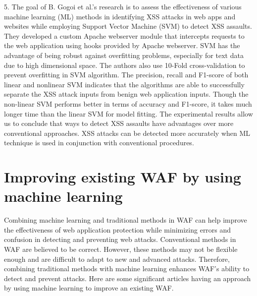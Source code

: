 5.	The goal of B. Gogoi et al.\cite{Gogoi}'s research is to assess the effectiveness of various machine learning (ML) methods in identifying XSS attacks in web apps and websites while employing Support Vector Machine (SVM) to detect XSS assaults. They developed a custom Apache webserver module that intercepts requests to the web application using hooks provided by Apache webserver. SVM has the advantage of being robust against overfitting problems, especially for text data due to high dimensional space. The authors also use 10-Fold cross-validation to prevent overfitting in SVM algorithm. The precision, recall and F1-score of both linear and nonlinear SVM indicates that the algorithms are able to successfully separate the XSS attack inputs from benign web application inputs.  Though the non-linear SVM performs better in terms of accuracy and F1-score, it takes much longer time than the linear SVM for model fitting. The experimental results allow us to conclude that ways to detect XSS assaults have advantages over more conventional approaches. XSS attacks can be detected more accurately when ML technique is used in conjunction with conventional procedures. 
\section{Improving existing WAF by using machine learning}
\label{sec: improving_waf}
\hspace{0.5cm}Combining machine learning and traditional methods in WAF can help improve the effectiveness of web application protection while minimizing errors and confusion in detecting and preventing web attacks. Conventional methods in WAF are believed to be correct. However, these methods may not be flexible enough and are difficult to adapt to new and advanced attacks. Therefore, combining traditional methods with machine learning enhances WAF's ability to detect and prevent attacks.
Here are some significant articles having an approach by using machine learning to improve an existing WAF. 

